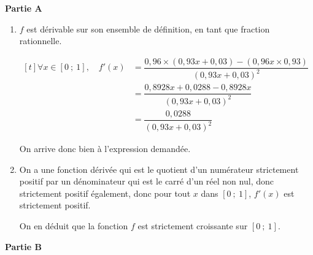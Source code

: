 \medskip

\textbf{Partie A}

\smallskip

\begin{enumerate}
	\item $f$ est dérivable sur son ensemble de définition, en tant que fraction rationnelle.

$\begin{aligned}[t] \forall x \in [0~;~1],\quad f'(x) &= \dfrac{0,96 \times (0,93 x + 0,03) - (0,96x \times 0,93)}{(0,93x + 0,03)^2}\\
&=\dfrac{0,8928 x + 0,0288 - 0,8928 x}{(0,93x + 0,03)^2}\\
&=\dfrac{0,0288}{(0,93x + 0,03)^2}\end{aligned}$

On arrive donc bien à l'expression demandée.

	\item On a une fonction dérivée qui est le quotient d'un numérateur strictement positif par un dénominateur qui est le carré d'un réel non nul, donc strictement positif également, donc pour tout $x$ dans $ [0~;~1] $, $f'(x)$ est strictement positif.

On en déduit que la fonction $f$ est strictement croissante sur $ [0~;~1] $.
	\end{enumerate}

	\bigskip

	\textbf{Partie B}

	\smallskip

